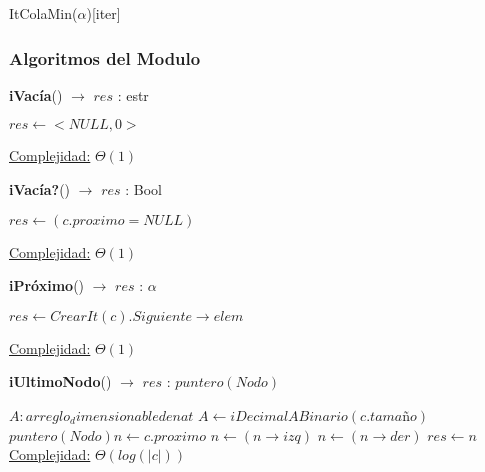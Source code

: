 \begin{Estructura}{ItColaMin($\alpha$)}[iter]
\subsubsection{Algoritmos del Modulo}

\begin{algorithm}[H]{\textbf{iVacía}() $\to$ $res$ : estr}
    	\begin{algorithmic}[1]
			\State $res \gets <NULL, 0>$ 
			
			\medskip
			\Statex \underline{Complejidad:} $\Theta(1)$
    	\end{algorithmic}
\end{algorithm}

\begin{algorithm}[H]{\textbf{iVacía?}() $\to$ $res$ : Bool}
    	\begin{algorithmic}[1]
			\State $res \gets (c.proximo = NULL)$ 
			
			\medskip
			\Statex \underline{Complejidad:} $\Theta(1)$
    	\end{algorithmic}
\end{algorithm}

\begin{algorithm}[H]{\textbf{iPróximo}() $\to$ $res$ : $\alpha$}
    	\begin{algorithmic}[1]
			\State $res \gets CrearIt(c).Siguiente \rightarrow elem$ 
			
			\medskip
			\Statex \underline{Complejidad:} $\Theta(1)$
    	\end{algorithmic}
\end{algorithm}

\begin{algorithm}[H]{\textbf{iUltimoNodo}() $\to$ $res$ : $puntero(Nodo)$}
    	\begin{algorithmic}[1]
	    	\State $A: arreglo_dimensionable de nat$ 
			\State $A \leftarrow iDecimalABinario(c.tamaño) $ 
			\State $puntero(Nodo) n \gets c.proximo$ 
			 
					\State $n \gets (n \rightarrow izq)$ 
				\Else
					\State $n \gets (n \rightarrow der)$ 
				\EndIf
			\EndFor
			\State $res \gets n $
    	\medskip
		\Statex \underline{Complejidad:} $\Theta(log(|c|))$
    	\end{algorithmic}
\end{algorithm}


\end{Estructura}
